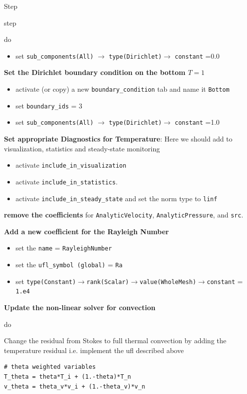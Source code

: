 \begin{steps}{Step}
\begin{steps}{step}
\begin{itemize}
\begin{steps}{do}
\begin{itemize}
\item set \texttt{sub\_components(All)} $\rightarrow$
  \texttt{type(Dirichlet)}$\rightarrow$ \texttt{constant} =0.0
  \end{itemize}
\item \textbf{Set the Dirichlet boundary condition on the bottom $T=1$}
  \begin{itemize}
  \item activate (or copy) a new \texttt{boundary\_condition} tab and name it \texttt{Bottom}
\item set \texttt{boundary\_ids} = 3
\item set \texttt{sub\_components(All)} $\rightarrow$
  \texttt{type(Dirichlet)}$\rightarrow$ \texttt{constant} =1.0
  \end{itemize}
\item \textbf{Set appropriate Diagnostics for Temperature}:  Here we
  should add to visualization, statistics and steady-state monitoring
  \begin{itemize}
  \item activate \texttt{include\_in\_visualization}
  \item activate \texttt{include\_in\_statistics}. 
\item activate \texttt{include\_in\_steady\_state} and set the norm
  type to \texttt{linf}
  \end{itemize}
        \end{steps}
      \end{itemize}

    \item \textbf{remove the coefficients} for \texttt{AnalyticVelocity},
      \texttt{AnalyticPressure}, and \texttt{src}.
    \item \textbf{Add a new coefficient for the Rayleigh Number}
      \begin{itemize}
      \item set the \texttt{name} = \texttt{RayleighNumber}
      \item set the \texttt{ufl\_symbol (global)} = \texttt{Ra}
      \item set
        \texttt{type(Constant)}$\rightarrow$\texttt{rank(Scalar)}$\rightarrow$\texttt{value(WholeMesh)}$\rightarrow$\texttt{constant}
        = \texttt{1.e4}
      \end{itemize}
    \item \textbf{Update the non-linear solver for convection}
    \begin{steps}{do}
    \item Change the residual from Stokes to full   thermal convection
      by adding the temperature residual i.e. implement the ufl
      described above 
\pagebreak{}
    \begin{lstlisting}[style=UFL]
# theta weighted variables
T_theta = theta*T_i + (1.-theta)*T_n
v_theta = theta_v*v_i + (1.-theta_v)*v_n


\end{lstlisting}
\end{steps}
\end{steps}
\end{steps}
